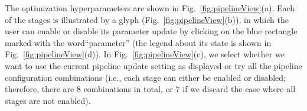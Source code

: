 The optimization hyperparameters are shown in Fig.~\ref{fig:pipelineView}(a). Each of the stages is illustrated by a glyph (Fig.~\ref{fig:pipelineView}(b)), in which the user can enable or disable its parameter update by clicking on the blue rectangle marked with the word``parameter'' (the legend about its state is shown in Fig.~\ref{fig:pipelineView}(d)). In Fig.~\ref{fig:pipelineView}(c), we select whether we want to use the current pipeline update setting as displayed or try all the pipeline configuration combinations (i.e., each stage can either be enabled or disabled; therefore, there are $8$ combinations in total, or $7$ if we discard the case where all stages are not enabled).




